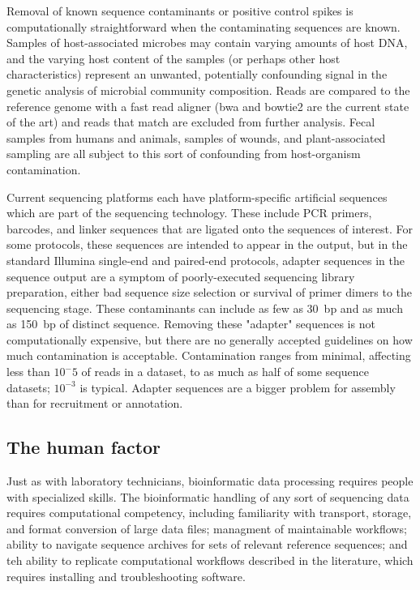 \documentclass[graybox]{svmult}
\begin{document}
        Removal of known sequence contaminants or positive control spikes is computationally straightforward when the contaminating sequences are known.   Samples of host-associated microbes may contain varying amounts of host DNA, and the varying host content of the samples (or perhaps other host characteristics) represent an unwanted, potentially confounding signal in the genetic analysis of microbial community composition.  Reads are compared to the reference genome with a fast read aligner (bwa and bowtie2 are the current state of the art) and reads that match are excluded from further analysis.   Fecal samples from humans and animals, samples of wounds, and plant-associated sampling are all subject to this sort of confounding from host-organism contamination. 

        Current sequencing platforms each have platform-specific artificial sequences which are part of the sequencing technology.  These include PCR primers,  barcodes, and linker sequences that are ligated onto the sequences of interest.
For some protocols, these sequences are intended to appear in the output, but in the standard Illumina single-end and paired-end protocols, adapter sequences in the sequence output are a symptom of poorly-executed sequencing library preparation, either bad sequence size selection or survival of primer dimers to the sequencing stage.
These contaminants can include as few as 30~bp and as much as 150~bp of distinct sequence.   Removing these "adapter" sequences is not computationally expensive, but there are no generally accepted guidelines on how much contamination is acceptable.  Contamination ranges from minimal, affecting less than $10^-5$ of reads in a dataset, to as much as half of some sequence datasets; $10^{-3}$ is typical. 
Adapter sequences are a bigger problem for assembly than for recruitment or annotation.

\subsection{The human factor}
Just as with laboratory technicians, bioinformatic data processing requires people with specialized skills.  The bioinformatic handling of any sort of sequencing data requires computational competency, including familiarity with transport, storage, and format conversion of large data files; managment of maintainable workflows; ability to navigate sequence archives for sets of relevant reference sequences; and teh ability to replicate computational workflows described in the literature, which requires installing and troubleshooting software.
\end{document}
